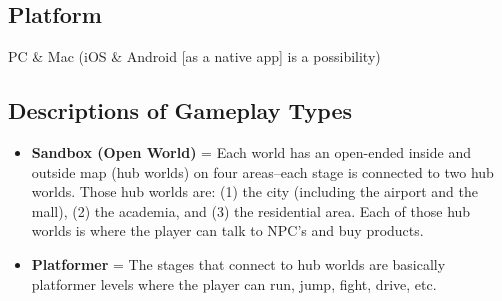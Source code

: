 \documentclass[12pt]{article}
\begin{document}
\subsection*{Platform}
PC \& Mac (iOS \& Android [as a native app] is a possibility)
\subsection*{Descriptions of Gameplay Types}
\begin{addmargin}[5mm]{0em}
\begin{itemize}[noitemsep]
\item \textbf{Sandbox (Open World)} = Each world has an open-ended inside and outside map (hub worlds) on four areas--each stage is connected to two hub worlds. Those hub worlds are: (1) the city (including the airport and the mall), (2) the academia, and (3) the residential area. Each of those hub worlds is where the player can talk to NPC's and buy products.
\item \textbf{Platformer} = The stages that connect to hub worlds are basically platformer levels where the player can run, jump, fight, drive, etc.
\end{itemize}
\end{addmargin}
\newpage
\end{document}
